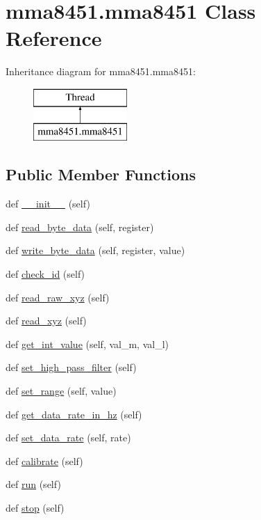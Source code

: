 \hypertarget{classmma8451_1_1mma8451}{}\section{mma8451.\+mma8451 Class Reference}
\label{classmma8451_1_1mma8451}
Inheritance diagram for mma8451.\+mma8451\+:\begin{figure}[H]
\begin{center}
\leavevmode
\includegraphics[height=2.000000cm]{classmma8451_1_1mma8451}
\end{center}
\end{figure}
\subsection*{Public Member Functions}
\begin{DoxyCompactItemize}
\item 
def \hyperlink{classmma8451_1_1mma8451_a778d5e81d0ed420045ef46e4e63ec2b8}{\+\_\+\+\_\+init\+\_\+\+\_\+} (self)
\item 
def \hyperlink{classmma8451_1_1mma8451_a41797c862f4ad2d8ef341056bb402c19}{read\+\_\+byte\+\_\+data} (self, register)
\item 
def \hyperlink{classmma8451_1_1mma8451_a8623dc076a6426e3946fb5c2482ba61a}{write\+\_\+byte\+\_\+data} (self, register, value)
\item 
def \hyperlink{classmma8451_1_1mma8451_a9a0d3d3fa5986b5d3ba43017c1d0e4d6}{check\+\_\+id} (self)
\item 
def \hyperlink{classmma8451_1_1mma8451_ae73bfb2314ef0a6175a73eb55c6a8584}{read\+\_\+raw\+\_\+xyz} (self)
\item 
def \hyperlink{classmma8451_1_1mma8451_af180360e06b1ad92a828f9b827723f7f}{read\+\_\+xyz} (self)
\item 
def \hyperlink{classmma8451_1_1mma8451_a540961793df44f27a640a1fbf90ed01b}{get\+\_\+int\+\_\+value} (self, val\+\_\+m, val\+\_\+l)
\item 
def \hyperlink{classmma8451_1_1mma8451_a2f5dadef2b037275ea03377643894fea}{set\+\_\+high\+\_\+pass\+\_\+filter} (self)
\item 
def \hyperlink{classmma8451_1_1mma8451_af83d50cf982bf4ecf898a8175fe9816a}{set\+\_\+range} (self, value)
\item 
def \hyperlink{classmma8451_1_1mma8451_a8d0a764cd5e7e33051f254f27eb2098f}{get\+\_\+data\+\_\+rate\+\_\+in\+\_\+hz} (self)
\item 
def \hyperlink{classmma8451_1_1mma8451_a7bfede66dd75d9d422775860818994db}{set\+\_\+data\+\_\+rate} (self, rate)
\item 
def \hyperlink{classmma8451_1_1mma8451_add58736fe80c5107ff4db30cff538222}{calibrate} (self)
\item 
def \hyperlink{classmma8451_1_1mma8451_a4eee718e56ce61a0b4284edde9f8de11}{run} (self)
\item 
def \hyperlink{classmma8451_1_1mma8451_a90b565e9288ddd6cd5a524d4d79837a7}{stop} (self)
\end{DoxyCompactItemize}
